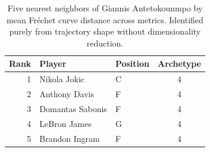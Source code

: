\begin{table}[htbp]
  \centering\small
  \begin{tabular}{rllc}
    \toprule
    Rank & Player & Position & Archetype \\
    \midrule
    1 & Nikola Jokic & C & 4 \\
    2 & Anthony Davis & F & 4 \\
    3 & Domantas Sabonis & F & 4 \\
    4 & LeBron James & G & 4 \\
    5 & Brandon Ingram & F & 4 \\
    \bottomrule
  \end{tabular}
  \caption{Five nearest neighbors of Giannis Antetokounmpo by mean Fr\'{e}chet curve distance across metrics. Identified purely from trajectory shape without dimensionality reduction.}
  \label{tab:Giannis_Antetokounmpo_frechet_curve_neighbors}
\end{table}

